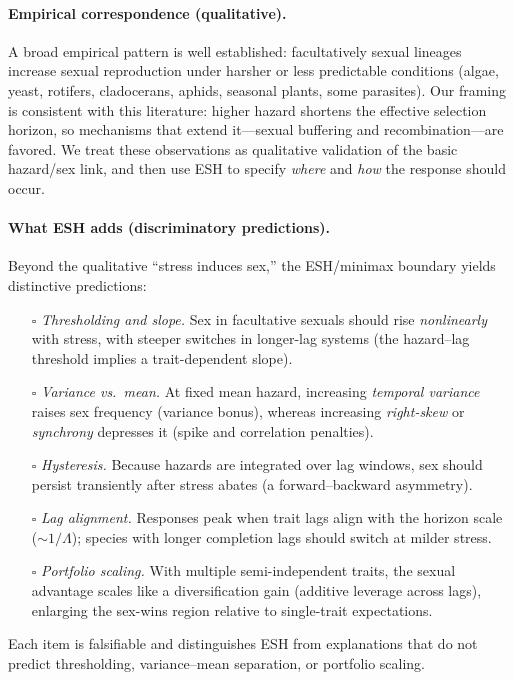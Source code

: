 \documentclass[11pt]{article}
\theoremstyle{upright}
\begin{document}
\paragraph{Empirical correspondence (qualitative).}
A broad empirical pattern is well established: facultatively sexual lineages increase sexual reproduction under harsher or less predictable conditions (algae, yeast, rotifers, cladocerans, aphids, seasonal plants, some parasites). Our framing is consistent with this literature: higher hazard shortens the effective selection horizon, so mechanisms that extend it—sexual buffering and recombination—are favored. We treat these observations as qualitative validation of the basic hazard/sex link, and then use ESH to specify \emph{where} and \emph{how} the response should occur.

\paragraph{What ESH adds (discriminatory predictions).}
Beyond the qualitative “stress induces sex,” the ESH/minimax boundary yields distinctive predictions:
\begin{itemize}
  \item[$\square$] \textit{Thresholding and slope.} Sex in facultative sexuals should rise \emph{nonlinearly} with stress, with steeper switches in longer-lag systems (the hazard–lag threshold implies a trait-dependent slope).
  \item[$\square$] \textit{Variance vs.\ mean.} At fixed mean hazard, increasing \emph{temporal variance} raises sex frequency (variance bonus), whereas increasing \emph{right-skew} or \emph{synchrony} depresses it (spike and correlation penalties).
  \item[$\square$] \textit{Hysteresis.} Because hazards are integrated over lag windows, sex should persist transiently after stress abates (a forward–backward asymmetry).
  \item[$\square$] \textit{Lag alignment.} Responses peak when trait lags align with the horizon scale ($\sim\!1/\Lambda$); species with longer completion lags should switch at milder stress.
  \item[$\square$] \textit{Portfolio scaling.} With multiple semi-independent traits, the sexual advantage scales like a diversification gain (additive leverage across lags), enlarging the sex-wins region relative to single-trait expectations.
\end{itemize}
Each item is falsifiable and distinguishes ESH from explanations that do not predict thresholding, variance–mean separation, or portfolio scaling.
\end{document}
